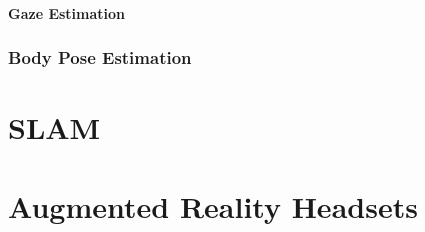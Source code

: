\paragraph{Gaze Estimation}

\subsubsection{Body Pose Estimation}

\section{SLAM}

\section{Augmented Reality Headsets}